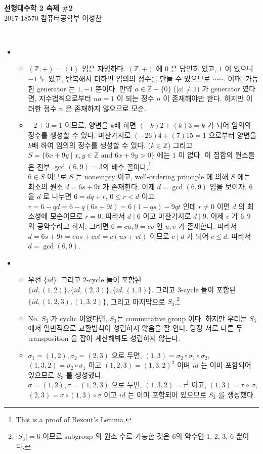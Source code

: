 \documentclass[12pt]{report}
\newcommand{\numl}[1]{\item[\large\textbf{\sffamily #1}]}
\newcommand{\num}[1]{\item[\textbf{\sffamily #1}]}
\newcommand{\bb}[1]{\mathbb{#1}}
\renewcommand{\span}[1]{\left\langle #1 \right\rangle}
\begin{document}
\begin{center}
\textbf{\Large 선형대수학 2 숙제 \#2}\\
\large 2017-18570 컴퓨터공학부 이성찬
\end{center}
~
\begin{itemize}
\numl{11.3.18}
	\begin{itemize}
		\num{(가)} $(\bb{Z}, +) =\span{1}$ 임은 자명하다. $(\bb{Z}, +)$ 에 $0$ 은 당연히 있고, $1$ 이 있으니 $-1$ 도 있고, 반복해서 더하면 임의의 정수를 만들 수 있으므로 $\cdots\cdots$. 이때, 가능한 generator 는 $1, -1$ 뿐이다. 만약 $a \in \bb{Z} - \{0\}$ ($|a| \neq 1$) 가 generator 였다면, 지수법칙으로부터 $na=1$ 이 되는 정수 $n$ 이 존재해야만 한다. 하지만 이러한 정수 $n$ 은 존재하지 않으므로 모순.
		\num{(다)} $-2 + 3 = 1$ 이므로, 양변을 $k$배 하면 $(-k)2+(k)3=k$ 가 되어 임의의 정수를 생성할 수 있다. 마찬가지로 $(-26)4+(7)15=1$ 으로부터 양변을 $k$배 하여 임의의 정수를 생성할 수 있다. ($k\in\bb{Z}$) 그리고 $S = \{6x+9y \; | \; x, y\in\bb{Z} \text{ and } 6x+9y>0\}$ 에는 $1$ 이 없다. 이 집합의 원소들은 전부 $\gcd(6, 9)=3$의 배수 꼴이다.\footnote{This is a proof of Bezout's Lemma.} \\$6\in S$ 이므로 $S$ 는 nonempty 이고, well-ordering principle 에 의해 $S$ 에는 최소의 원소 $d=6s+9t$ 가 존재한다. 이제 $d=\gcd(6, 9)$ 임을 보이자. $6$ 을 $d$ 로 나누면 $6=dq+r$, $0\leq r <d$ 이고 $r = 6-qd = 6-q(6s+9t) = 6(1-qs)-9qt$ 인데 $r \neq 0$ 이면 $d$ 의 최소성에 모순이므로 $r=0$. 따라서 $d\;|\; 6$ 이고 마찬가지로 $d\;|\;9$. 이제 $c$ 가 $6, 9$ 의 공약수라고 하자. 그러면 $6=cu, 9=cv$ 인 $u, v$ 가 존재한다. 따라서 $d=6s+9t=cus+cvt=c(us+vt)$ 이므로 $c\;|\;d$ 가 되어 $c\leq d$. 따라서 $d = \gcd(6, 9)$.
	\end{itemize}
	
\numl{11.3.20} 
	\begin{itemize}
		\num{(가)} 우선 $\{id\}$. 그리고 2-cycle 들이 포함된 $\{id, (1, 2)\}, \{id, (2, 3)\}, \{id, (1, 3)\}$. 그리고 3-cycle 들이 포함된 $\{id, (1, 2, 3), (1, 3, 2)\}$, 그리고 마지막으로 $S_3$.\footnote{$|S_3|=6$ 이므로 subgroup 의 원소 수로 가능한 것은 6의 약수인 1, 2, 3, 6 뿐이다.}
		\num{(나)} No. $S_3$ 가 cyclic 이었다면, $S_3$는 commutative group 이다. 하지만 우리는 $S_3$ 에서 일반적으로 교환법칙이 성립하지 않음을 잘 안다. 당장 서로 다른 두 transposition 을 잡아 계산해봐도 성립하지 않는다.
		\num{(다)} $\sigma_1 = (1, 2), \sigma_2=(2, 3)$ 으로 두면, $(1, 3) = \sigma_2\circ\sigma_1\circ\sigma_2$, $(1, 3, 2) = \sigma_2\circ\sigma_1$ 이고 $(1, 2, 3) = (1, 3, 2)^2$ 이며 $id$ 는 이미 포함되어 있으므로 $S_3$ 를 생성했다.\\
		$\sigma =(1, 2), \tau = (1, 2, 3)$ 으로 두면, $(1, 3, 2) = \tau^2$ 이고, $(1, 3) = \tau\,\circ\, \sigma$, $(2, 3) = \sigma \circ (1, 3) \circ \sigma$ 이고 $id$ 는 이미 포함되어 있으므로 $S_3$ 를 생성했다.
	\end{itemize}


\end{itemize}
\end{document}
